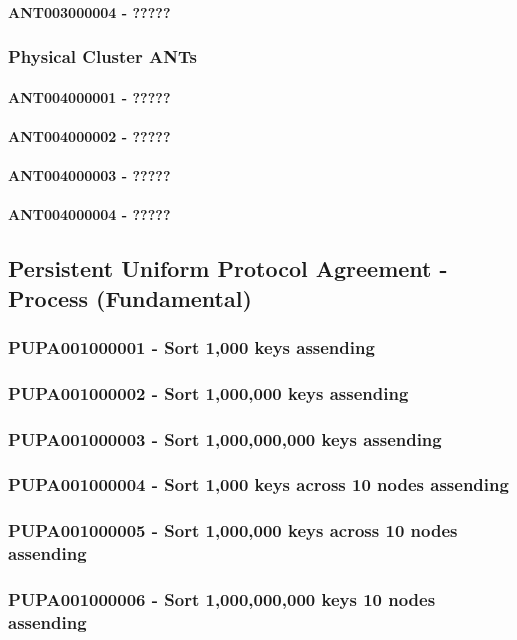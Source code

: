 \paragraph{ANT003000004 - ?????}
\subsubsection{Physical Cluster ANTs}
\paragraph{ANT004000001 - ?????}
\paragraph{ANT004000002 - ?????}
\paragraph{ANT004000003 - ?????}
\paragraph{ANT004000004 - ?????}
\subsection{Persistent Uniform Protocol Agreement - Process (Fundamental)}
\subsubsection{PUPA001000001 - Sort 1,000 keys assending}
\subsubsection{PUPA001000002 - Sort 1,000,000 keys assending}
\subsubsection{PUPA001000003 - Sort 1,000,000,000 keys assending}
\subsubsection{PUPA001000004 - Sort 1,000 keys across 10 nodes assending}
\subsubsection{PUPA001000005 - Sort 1,000,000 keys across 10 nodes assending}
\subsubsection{PUPA001000006 - Sort 1,000,000,000 keys 10 nodes assending}
